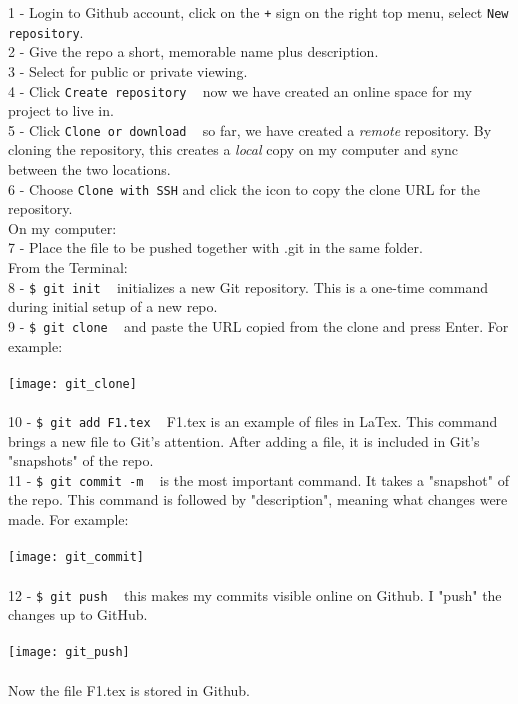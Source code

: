 \documentclass{article}
\begin{document}
{{{1 - Login to Github account, click on the \texttt{+} sign on the right top menu, select \texttt{New repository}.\\
2 - Give the repo a short, memorable name plus description. \\
3 - Select for public or private viewing.\\ 
4 - Click \texttt{Create repository} ~ now we have created an online space for my project to live in. \\
5 - Click \texttt{Clone or download} ~ so far, we have created a \textit{remote} repository. By cloning the repository, this creates a \textit{local} copy on my computer and sync between the two locations.\\
6 - Choose \texttt{Clone with SSH} and click the icon to copy the clone URL for the repository.\\
On my computer:\\
7 - Place the file to be pushed together with .git in the same folder.\\
From the Terminal:\\
8 - \texttt{\$ git init} ~ initializes a new Git repository. This is a one-time command during initial setup of a new repo.\\
9 - \texttt{\$ git clone} ~ and paste the URL copied from the clone and press Enter. For example: \\
\\
\texttt{[image: git\_clone]}\\
\\
10 - \texttt{\$ git add F1.tex} ~ F1.tex is an example of files in LaTex. This command brings a new file to Git's attention. After adding a file, it is included in Git's "snapshots" of the repo.\\
11 - \texttt{\$ git commit -m} ~ is the most important command. It takes a "snapshot" of the repo. This command is followed by "description", meaning what changes were made. For example: \\
\\
\texttt{[image: git\_commit]}\\
\\
12 - \texttt{\$ git push} ~ this makes my commits visible online on Github. I "push" the changes up to GitHub. \\
\\
\texttt{[image: git\_push]}\\
\\
Now the file F1.tex is stored in Github.

}}}
\end{document}
